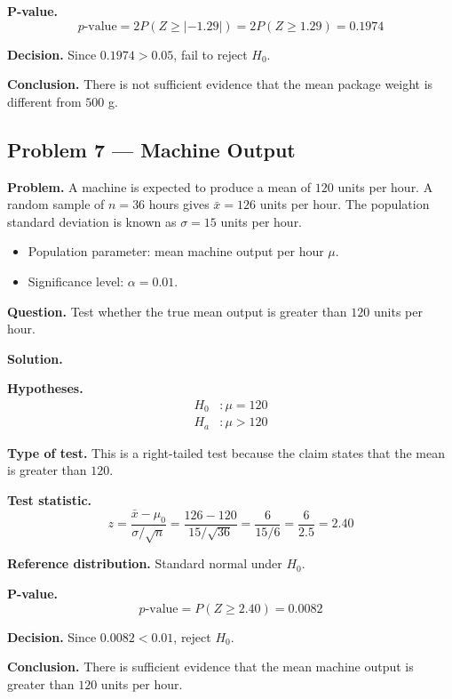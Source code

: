 \begin{ExamProblems}
\textbf{P-value.}
\[
p\text{-value}=2P(Z\ge |{-1.29}|)=2P(Z\ge 1.29)=0.1974
\]

\textbf{Decision.} Since \(0.1974>0.05\), fail to reject \(H_0\).

\textbf{Conclusion.} There is not sufficient evidence that the mean package weight is different from \(500\) g.

\hypertarget{c5-ex7}{}
\item
\subsection*{Problem 7 — Machine Output}

\textbf{Problem.} A machine is expected to produce a mean of \(120\) units per hour. A random sample of \(n=36\) hours gives \(\bar{x}=126\) units per hour. The population standard deviation is known as \(\sigma=15\) units per hour.
\begin{itemize}
    \item Population parameter: mean machine output per hour \(\mu\).
    \item Significance level: \(\alpha=0.01\).
\end{itemize}

\textbf{Question.} Test whether the true mean output is greater than \(120\) units per hour.

\textbf{Solution.}

\textbf{Hypotheses.}
\[
\begin{aligned}
H_0&: \mu = 120 \\
H_a&: \mu > 120
\end{aligned}
\]

\textbf{Type of test.} This is a right-tailed test because the claim states that the mean is greater than \(120\).

\textbf{Test statistic.}
\[
z = \frac{\bar{x}-\mu_0}{\sigma/\sqrt{n}} = \frac{126-120}{15/\sqrt{36}} = \frac{6}{15/6} = \frac{6}{2.5} = 2.40
\]

\textbf{Reference distribution.} Standard normal under \(H_0\).

\textbf{P-value.}
\[
p\text{-value}=P(Z\ge 2.40)=0.0082
\]

\textbf{Decision.} Since \(0.0082<0.01\), reject \(H_0\).

\textbf{Conclusion.} There is sufficient evidence that the mean machine output is greater than \(120\) units per hour.


\end{ExamProblems}
